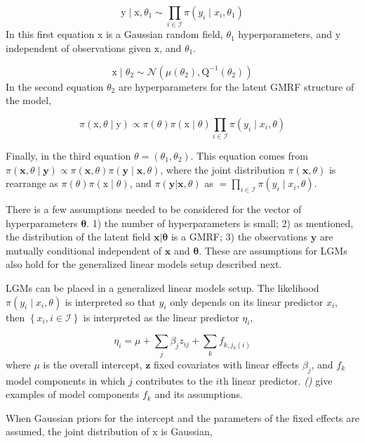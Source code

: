 \documentclass[
]{book}
\begin{document}
\[\mathrm{y} \mid \mathrm{x}, \theta_1 \sim \prod_{i \in \mathcal{I}} \pi\left(y_i \mid x_i, \theta_1\right)\]
In this first equation \(\mathrm{x}\) is a Gaussian random field, \(\theta_1\) hyperparameters, and \(\mathrm{y}\) independent of observations given \(\mathrm{x}\), and \(\theta_1\).

\[\mathrm{x} \mid \theta_2 \sim \mathcal{N}\left(\mu\left(\theta_2\right), \mathrm{Q}^{-1}\left(\theta_2\right)\right)\]
In the second equation \(\theta_2\) are hyperparameters for the latent GMRF structure of the model,

\[\pi(\mathrm{x}, \theta \mid \mathrm{y}) \propto \pi(\theta) \pi(\mathrm{x} \mid \theta) \prod_{i \in \mathcal{I}} \pi\left(y_i \mid x_i, \theta\right)\]

Finally, in the third equation \(\theta=(\theta_1, \theta_2)\). This equation comes from \(\pi(\mathbf{x}, \theta \mid \mathbf{y}) \propto \pi(\mathbf{x},\theta) \pi(\mathbf{y} \mid \mathbf{x}, \theta)\), where the joint distribution \(\pi(\mathbf{x}, \theta)\) is rearrange as \(\pi(\theta) \pi(\mathrm{x} \mid \theta)\), and \(\pi(\mathbf{y}|\mathbf{x},\theta)\) as \(= \prod_{i \in \mathcal{I}} \pi\left(y_i \mid x_i, \theta\right)\).

There is a few assumptions needed to be considered for the vector of hyperparameters \(\mathbf{\theta}\). 1) the number of hyperparameters is small; 2) as mentioned, the distribution of the latent field \(\mathbf{x}|\mathbf{\theta}\) is a GMRF; 3) the observations \(\mathbf{y}\) are mutually conditional independent of \(\mathbf{x}\) and \(\mathbf{\theta}\). These are assumptions for LGMs also hold for the generalized linear models setup described next.

LGMs can be placed in a generalized linear models setup. The likelihood \(\pi\left(y_i \mid x_i, \theta\right)\) is interpreted so that \(y_i\) only depends on its linear predictor \(x_i\), then \(\left\{x_i, i \in \mathcal{I}\right\}\) is interpreted as the linear predictor \(\eta_i\),

\[\eta_i=\mu+\sum_j \beta_j z_{i j}+\sum_k f_{k, j_k(i)}\]
where \(\mu\) is the overall intercept, \(\mathbf{z}\) fixed covariates with linear effects \({\beta_j}\), and \(f_{k}\) model components in which \(j\) contributes to the \(i\)th linear predictor. \emph{()} give examples of model components \(f_{k}\) and its assumptions.

When Gaussian priors for the intercept and the parameters of the fixed effects are assumed, the joint distribution of \(\mathrm{x}\) is Gaussian,
\end{document}
